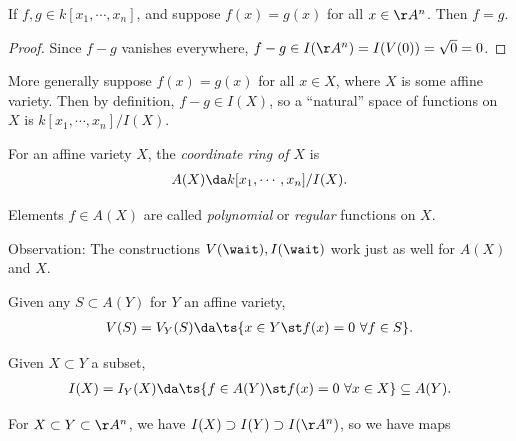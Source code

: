 \begin{proposition}[?]

If \(f, g\in k[x_1, \cdots, x_n]\), and suppose \(f(x) = g(x)\) for all
\(x\in \AA^n\). Then \(f = g\).

\end{proposition}

\begin{proof}

Since \(f-g\) vanishes everywhere,
\(f-g \in I(\AA^n) = I(V(0)) = \sqrt{0} = 0\).

\end{proof}

More generally suppose \(f(x) = g(x)\) for all \(x\in X\), where \(X\)
is some affine variety. Then by definition, \(f-g \in I(X)\), so a
``natural'' space of functions on \(X\) is \(k[x_1,\cdots, x_n]/I(X)\).

\begin{definition}

For an affine variety \(X\), the \emph{coordinate ring of \(X\)} is
\begin{align*}  
A(X) \da k[x_1, \cdots, x_n]/ I(X)
.\end{align*}

Elements \(f\in A(X)\) are called \emph{polynomial} or \emph{regular}
functions on \(X\).

\end{definition}

Observation: The constructions \(V(\wait), I(\wait)\) work just as well
for \(A(X)\) and \(X\).

Given any \(S\subset A(Y)\) for \(Y\) an affine variety,
\begin{align*}  
V(S) = V_Y(S) \da\ts{x\in Y \st f(x) = 0\,\,\forall f\in S}
.\end{align*}

Given \(X\subset Y\) a subset,
\begin{align*}  
I(X) = I_Y(X) \da\ts{f\in A(Y) \st f(x) = 0\,\,\forall x\in X} \subseteq A(Y)
.\end{align*}

\begin{example}

For \(X\subset Y \subset \AA^n\), we have
\(I(X) \supset I(Y) \supset I(\AA^n)\), so we have maps

\begin{center}\end{center}

\end{example}

